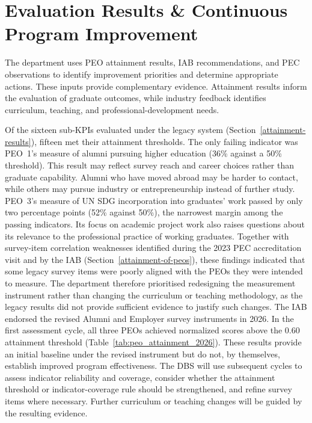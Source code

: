 \hypertarget{program-improvement}{%
\section{Evaluation Results \& Continuous Program Improvement}\label{program-improvement}}

The department uses PEO attainment results, IAB recommendations, and PEC observations to identify improvement priorities and determine appropriate actions. These inputs provide complementary evidence. Attainment results inform the evaluation of graduate outcomes, while industry feedback identifies curriculum, teaching, and professional-development needs.

Of the sixteen sub-KPIs evaluated under the legacy system (Section~\ref{attainment-results}), fifteen met their attainment thresholds. The only failing indicator was PEO~1's measure of alumni pursuing higher education (36\% against a 50\% threshold). This result may reflect survey reach and career choices rather than graduate capability. Alumni who have moved abroad may be harder to contact, while others may pursue industry or entrepreneurship instead of further study. PEO~3's measure of UN SDG incorporation into graduates' work passed by only two percentage points (52\% against 50\%), the narrowest margin among the passing indicators. Its focus on academic project work also raises questions about its relevance to the professional practice of working graduates. Together with survey-item correlation weaknesses identified during the 2023 PEC accreditation visit and by the IAB (Section~\ref{attainment-of-peos}), these findings indicated that some legacy survey items were poorly aligned with the PEOs they were intended to measure. The department therefore prioritised redesigning the measurement instrument rather than changing the curriculum or teaching methodology, as the legacy results did not provide sufficient evidence to justify such changes. The IAB endorsed the revised Alumni and Employer survey instruments in 2026. In the first assessment cycle, all three PEOs achieved normalized scores above the 0.60 attainment threshold (Table~\ref{tab:peo_attainment_2026}). These results provide an initial baseline under the revised instrument but do not, by themselves, establish improved program effectiveness. The DBS will use subsequent cycles to assess indicator reliability and coverage, consider whether the attainment threshold or indicator-coverage rule should be strengthened, and refine survey items where necessary. Further curriculum or teaching changes will be guided by the resulting evidence.

